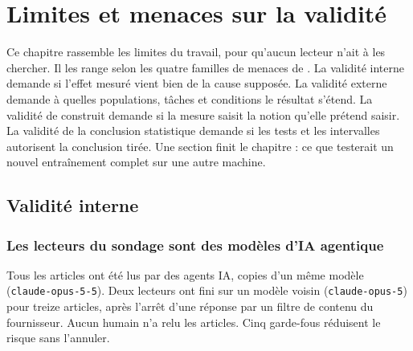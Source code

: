 \chapter{Limites et menaces sur la validité}
\label{chap:10-limites}

Ce chapitre rassemble les limites du travail, pour qu'aucun lecteur n'ait à les chercher. Il les
range selon les quatre familles de menaces de \textcite{shadish2002experimental}. La validité
interne demande si l'effet mesuré vient bien de la cause supposée. La validité externe demande à
quelles populations, tâches et conditions le résultat s'étend. La validité de construit demande si
la mesure saisit la notion qu'elle prétend saisir. La validité de la conclusion statistique demande
si les tests et les intervalles autorisent la conclusion tirée. Une section finit le chapitre : ce que testerait un nouvel
entraînement complet sur une autre machine.

\section{Validité interne}
\label{sec:val-interne}

\subsection{Les lecteurs du sondage sont des modèles d'IA agentique}

Tous les articles ont été lus par des agents IA, copies d'un même modèle
(\texttt{claude-opus-5-5}). Deux lecteurs ont fini sur un modèle voisin (\texttt{claude-opus-5})
pour treize articles, après l'arrêt d'une réponse par un filtre de contenu du fournisseur. Aucun
humain n'a relu les articles. Cinq garde-fous réduisent le risque sans l'annuler.

